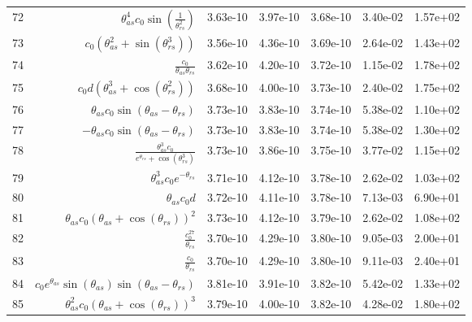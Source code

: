 \begin{tabularx}{\textwidth}{lRRRRRl}
72  &  $ \theta_{as}^{4} c_{0} \sin{\left(\displaystyle\frac{1}{\theta_{rs}^{2}} \right)} $  &  3.63e-10  &  3.97e-10  &  3.68e-10  &  3.40e-02  &  1.57e+02  \\ 
73  &  $ c_{0} \left(\theta_{as}^{2} + \sin{\left(\theta_{rs}^{3} \right)}\right) $  &  3.56e-10  &  4.36e-10  &  3.69e-10  &  2.64e-02  &  1.43e+02  \\ 
74  &  $ \displaystyle\frac{c_{0}}{\theta_{as} \theta_{rs}} $  &  3.62e-10  &  4.20e-10  &  3.72e-10  &  1.15e-02  &  1.78e+02  \\ 
75  &  $ c_{0} d \left(\theta_{as}^{3} + \cos{\left(\theta_{rs}^{2} \right)}\right) $  &  3.68e-10  &  4.00e-10  &  3.73e-10  &  2.40e-02  &  1.75e+02  \\ 
76  &  $ \theta_{as} c_{0} \sin{\left(\theta_{as} - \theta_{rs} \right)} $  &  3.73e-10  &  3.83e-10  &  3.74e-10  &  5.38e-02  &  1.10e+02  \\ 
77  &  $ - \theta_{as} c_{0} \sin{\left(\theta_{as} - \theta_{rs} \right)} $  &  3.73e-10  &  3.83e-10  &  3.74e-10  &  5.38e-02  &  1.30e+02  \\ 
78  &  $ \displaystyle\frac{\theta_{as}^{3} c_{0}}{e^{\theta_{rs}} + \cos{\left(\theta_{rs}^{3} \right)}} $  &  3.73e-10  &  3.86e-10  &  3.75e-10  &  3.77e-02  &  1.15e+02  \\ 
79  &  $ \theta_{as}^{3} c_{0} e^{- \theta_{rs}} $  &  3.71e-10  &  4.12e-10  &  3.78e-10  &  2.62e-02  &  1.03e+02  \\ 
80  &  $ \theta_{as} c_{0} d $  &  3.72e-10  &  4.11e-10  &  3.78e-10  &  7.13e-03  &  6.90e+01  \\ 
81  &  $ \theta_{as} c_{0} \left(\theta_{as} + \cos{\left(\theta_{rs} \right)}\right)^{2} $  &  3.73e-10  &  4.12e-10  &  3.79e-10  &  2.62e-02  &  1.08e+02  \\ 
82  &  $ \displaystyle\frac{c_{0}^{27}}{\theta_{rs}} $  &  3.70e-10  &  4.29e-10  &  3.80e-10  &  9.05e-03  &  2.00e+01  \\ 
83  &  $ \displaystyle\frac{c_{0}}{\theta_{rs}} $  &  3.70e-10  &  4.29e-10  &  3.80e-10  &  9.11e-03  &  2.40e+01  \\ 
84  &  $ c_{0} e^{\theta_{as}} \sin{\left(\theta_{as} \right)} \sin{\left(\theta_{as} - \theta_{rs} \right)} $  &  3.81e-10  &  3.91e-10  &  3.82e-10  &  5.42e-02  &  1.33e+02  \\ 
85  &  $ \theta_{as}^{2} c_{0} \left(\theta_{as} + \cos{\left(\theta_{rs} \right)}\right)^{3} $  &  3.79e-10  &  4.00e-10  &  3.82e-10  &  4.28e-02  &  1.80e+02  \\ 

\end{tabularx}
